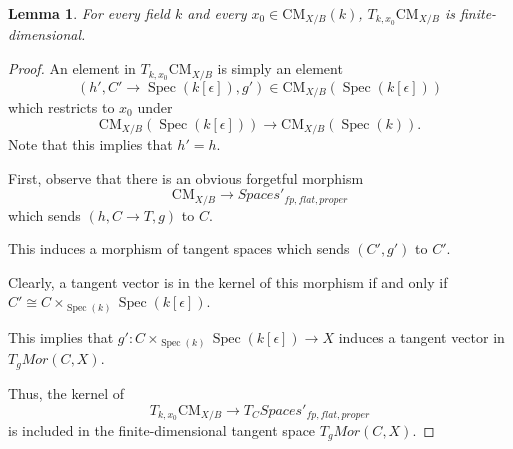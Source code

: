 \documentclass{article}
\newtheorem{lemma}[theorem]{Lemma}
\theoremstyle{definition}
\theoremstyle{theorem}
\theoremstyle{remark}
\theoremstyle{definition}
\DeclareMathOperator{\Spec}{Spec}
\newcommand{\CMfunctor}{\text{CM}}
\begin{document}
\begin{lemma}
	For every field $k$ and every $x_0\in \CMfunctor_{X/B}(k)$, $T_{k,x_0}\CMfunctor_{X/B}$ is finite-dimensional.
	\label{lem:axiom3}
\end{lemma}
\begin{proof}
	An element in $ T_{k,x_0}\CMfunctor_{X/B}$ is simply an element
	\[(h',C'\rightarrow \Spec(k[\epsilon]),g')\in \CMfunctor_{X/B}(\Spec(k[\epsilon]))\]
	which restricts to $x_0$ under 
	\[\CMfunctor_{X/B}(\Spec(k[\epsilon]))\rightarrow\CMfunctor_{X/B}(\Spec(k)).\]
	Note that this implies that $h'=h$.

	First, observe that there is an obvious forgetful morphism
	\[\CMfunctor_{X/B}\rightarrow Spaces'_{fp,flat,proper}\]
	which sends $(h,C\rightarrow T,g)$ to $C$.

	This induces a morphism of tangent spaces which sends $(C',g')$ to $C'$.

	Clearly, a tangent vector is in the kernel of this morphism if and only if $C'\cong C\times_{\Spec(k)} \Spec(k[\epsilon])$.
	
	This implies that $g':C\times_{\Spec(k)}\Spec(k[\epsilon])\rightarrow X$ induces a tangent vector in $T_gMor(C,X)$.

	Thus, the kernel of
	\[T_{k,x_0}\CMfunctor_{X/B}\rightarrow T_{C}Spaces'_{fp,flat,proper}\]
	is included in the finite-dimensional tangent space $T_gMor(C,X)$.
	\end{proof}
\end{document}
